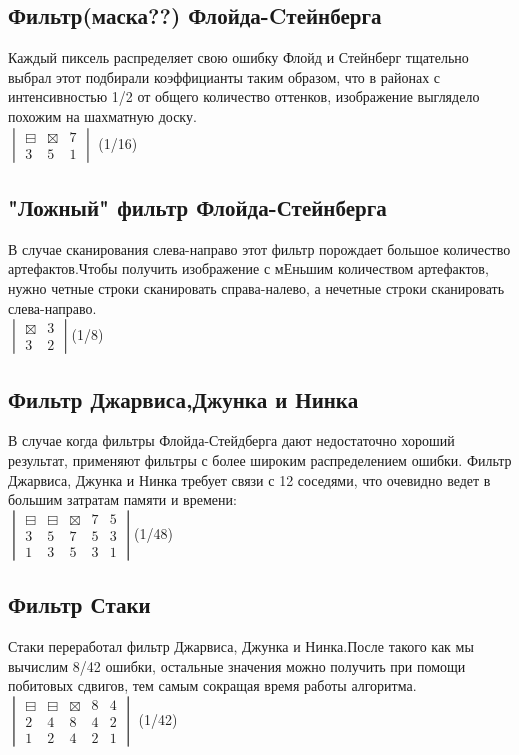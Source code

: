   \subsection{Фильтр(маска??) Флойда-Cтейнберга }
  Каждый пиксель распределяет свою ошибку Флойд и Стейнберг тщательно выбрал этот подбирали коэффицианты таким образом, что в районах с  интенсивностью 1/2 от общего количество оттенков, изображение выглядело похожим на шахматную доску.\\
$  \begin{vmatrix}
  	\boxminus & \boxtimes & 7\\
  	3 & 5 & 1
  \end{vmatrix}$ (1/16)
  \subsection{"Ложный"  фильтр Флойда-Стейнберга }
  В случае сканирования слева-направо этот фильтр порождает большое количество артефактов.Чтобы получить изображение с мЕньшим количеством артефактов, нужно четные строки сканировать справа-налево, а нечетные строки сканировать слева-направо.\\
  $\begin{vmatrix}
  \boxtimes & 3 \\
  3 & 2 
  \end{vmatrix} $(1/8)
  
  \subsection{Фильтр Джарвиса,Джунка и Нинка}
    В случае когда фильтры Флойда-Стейдберга дают недостаточно хороший результат, применяют фильтры с более широким распределением ошибки. Фильтр Джарвиса, Джунка и Нинка требует связи с 12 соседями, что очевидно ведет в большим затратам памяти и времени:\\
    $\begin{vmatrix}
    \boxminus & \boxminus & \boxtimes & 7 & 5\\
    3 & 5 & 7 & 5 &3 \\
    1 & 3 & 5 & 3 & 1 
    \end{vmatrix}$(1/48)

  \subsection{Фильтр Стаки}
  Стаки переработал фильтр Джарвиса, Джунка и Нинка.После такого как мы вычислим 8/42 ошибки, остальные значения можно получить при помощи побитовых сдвигов, тем самым сокращая время работы алгоритма.\\
  $\begin{vmatrix}
  \boxminus & \boxminus & \boxtimes & 8 & 4 \\
  2 & 4 & 8 & 4 & 2 \\
  1 & 2 & 4 & 2 & 1
  
  \end{vmatrix}$ (1/42)
  
